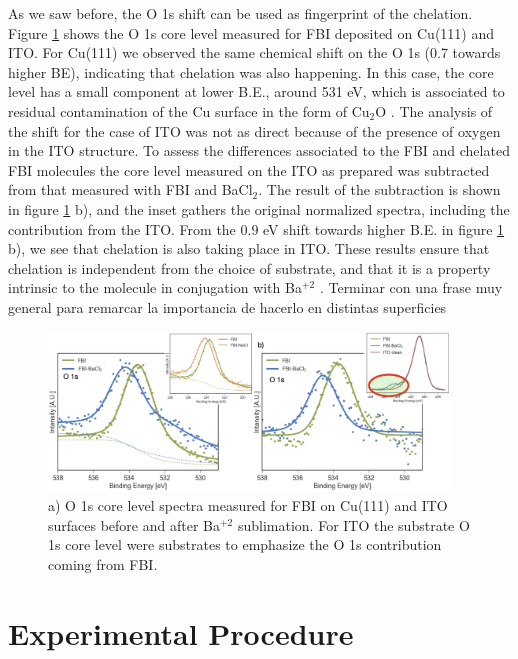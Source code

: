 \documentclass[aps,prl,reprint,longbibliography,superscriptaddress]{revtex4-1}
\def\Ba{Ba$^{+2}$ }
\newcommand{\completar}[1]{{\color{red} #1}}
\begin{document}
As we saw before, the O 1s shift can be used as fingerprint of the chelation. Figure \ref{XPS_FBI_Cu_ITO} shows the O 1s core level measured for FBI deposited on Cu(111) and ITO. For Cu(111) we observed the same chemical shift on the O 1s (0.7 towards higher BE), indicating that chelation was also happening. In this case, the core level has a small component at lower B.E., around 531 eV, which is associated to residual contamination of the Cu surface in the form of Cu$_2$O \cite{zhu_surface_2013}.
The analysis of the shift for the case of ITO was not as direct because of the presence of oxygen in the ITO structure. To assess the differences associated to the FBI and chelated FBI molecules the core level measured on the ITO as prepared  was subtracted from that measured with FBI and BaCl$_2$. The result of the subtraction is shown in figure \ref{XPS_FBI_Cu_ITO} b), and the inset gathers the original normalized spectra, including the contribution from the ITO. From the 0.9 eV shift towards higher B.E. in figure \ref{XPS_FBI_Cu_ITO} b), we see that chelation is also taking place in ITO. These results ensure that chelation is independent from the choice of substrate, and that it is a property intrinsic to the molecule in conjugation with \Ba. 
\completar{Terminar con una frase muy general para remarcar la importancia de hacerlo en distintas superficies}  


\begin{figure}[ht!]
	\includegraphics[width=0.95\textwidth]{figures/fig5_cu_ito.png}
	\caption{\label{XPS_FBI_Cu_ITO} 
    a) O 1s core level spectra measured for FBI on Cu(111) and ITO surfaces before and after \Ba sublimation. For ITO the substrate O 1s core level were substrates to emphasize the O 1s contribution coming from FBI.}
\end{figure}  


\section{Experimental Procedure}
\end{document}
